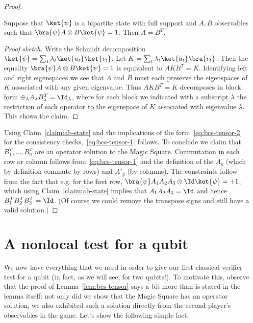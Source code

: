 \begin{proof}
\begin{claim}\label{claim:ab-state}
Suppose that $\ket{\psi}$ is a bipartite state with full support and $A,B$ observables such that $\bra{\psi} A\otimes B \ket{\psi} = 1$. Then $A=B^T$. 
\end{claim}

\begin{proof}[Proof sketch]
Write the Schmidt decomposition $\ket{\psi} = \sum_t \lambda_t \ket{u_t} \ket{v_t}$. Let $K = \sum_t \lambda_t \ket{u_t}\bra{v_t}$. Then the equality $\bra{\psi} A\otimes B \ket{\psi} = 1$ is equivalent to $AKB^T = K$. Identifying left and right eigenspaces we see that $A$ and $B$ must each preserve the eigenspaces of $K$ associated with any given eigenvalue. Thus $AKB^T = K$ decomposes in block form $\oplus_\lambda  A_\lambda B_\lambda^T = \Id_\lambda$, where for each block we indicated with a subscript $\lambda$ the restriction of each operator to the eigenspace of $K$ associated with eigenvalue $\lambda$. This shows the claim.  
\end{proof}

Using Claim~\ref{claim:ab-state} and the implications of the form~\eqref{eq:bcs-tensor-2} for the consistency checks,~\eqref{eq:bcs-tensor-1} follows. To conclude we claim that $B_1^T,\ldots,B_9^T$ are an operator solution to the Magic Square. Commutation in each row or column follows from~\eqref{eq:bcs-tensor-1} and the definition of the $A_y$ (which by definition commute by rows) and $A'_y$ (by columns). The constraints follow from the fact that e.g. for the first row, $\bra{\psi} A_1 A_2 A_3 \otimes \Id\ket{\psi} = +1$, which using Claim~\ref{claim:ab-state}  implies that $A_1A_2A_3 = \Id$ and hence $B_1^T B_2^T B_3^T = \Id$. (Of course we could remove the transpose signs and still have a valid solution.)
\end{proof}

\section{A nonlocal test for a qubit}

We now have everything that we need in order to give our first classical-verifier test for a qubit (in fact, as we will see, for two qubits!). To motivate this, observe that the proof of Lemma~\ref{lem:bcs-tensor} says a bit more than is stated in the lemma itself: not only did we show that the Magic Square has an operator solution, we also exhibited such a solution directly from the second player's observables in the game. Let's show the following simple fact. 

